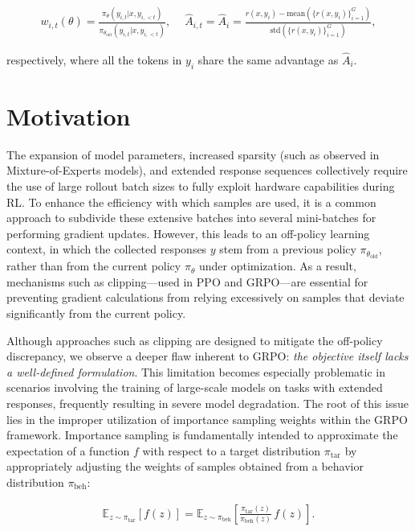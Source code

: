 \begin{align}
    w_{i,t}(\theta)=\frac{ \pi_{\theta} (y_{i,t} | x, y_{i,<t}) }{ \pi_{\theta_\text{old}} (y_{i,t} | x,y_{i,<t})},\quad\ 
    \widehat{A}_{i,t} = \widehat{A}_{i} = \frac{r(x, y_i) - \mathrm{mean} \left( \{ r(x, y_i) \}_{i=1}^G \right) }{ \mathrm{std} \left( \{ r(x, y_i) \}_{i=1}^G \right) },
\end{align}

respectively, where all the tokens in $y_i$ share the same advantage as $\widehat{A}_{i}$.

\section{Motivation}
\label{sec:motivation}

The expansion of model parameters, increased sparsity (such as observed in Mixture-of-Experts models), and extended response sequences collectively require the use of large rollout batch sizes to fully exploit hardware capabilities during RL. To enhance the efficiency with which samples are used, it is a common approach to subdivide these extensive batches into several mini-batches for performing gradient updates. However, this leads to an off-policy learning context, in which the collected responses $y$ stem from a previous policy $\pi_{\theta_\text{old}}$, rather than from the current policy $\pi_\theta$ under optimization. As a result, mechanisms such as clipping—used in PPO and GRPO—are essential for preventing gradient calculations from relying excessively on samples that deviate significantly from the current policy.

Although approaches such as clipping are designed to mitigate the off-policy discrepancy, we observe a deeper flaw inherent to GRPO: \textit{the objective itself lacks a well-defined formulation}. This limitation becomes especially problematic in scenarios involving the training of large-scale models on tasks with extended responses, frequently resulting in severe model degradation. The root of this issue lies in the improper utilization of importance sampling weights within the GRPO framework. Importance sampling is fundamentally intended to approximate the expectation of a function $f$ with respect to a target distribution $\pi_\text{tar}$ by appropriately adjusting the weights of samples obtained from a behavior distribution $\pi_\text{beh}$:

\begin{align}
\mathbb{E}_{z \sim \pi_\text{tar}} \left[ f(z) \right] = \mathbb{E}_{z \sim \pi_\text{beh}} \left[ \frac{ \pi_\text{tar} (z) }{ \pi_\text{beh} (z)} \, f(z) \right].
\end{align}

